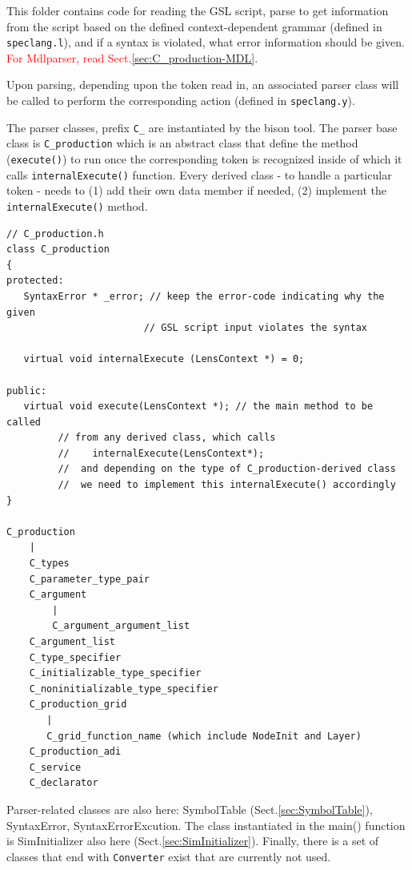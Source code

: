 
This folder contains code for reading the GSL script, parse to get information
from the script based on the defined context-dependent grammar (defined in
\verb!speclang.l!), and if a syntax is violated, what error information should
be given. \textcolor{red}{For Mdlparser, read Sect.\ref{sec:C_production-MDL}}.

Upon parsing, depending upon the token read in, an associated parser class will
be called to perform the corresponding action (defined in \verb!speclang.y!).

The parser classes, prefix \verb!C_! are instantiated by the bison tool.
The parser base class is \verb!C_production! which is an abstract class that
define the method (\verb!execute()!) to run once the corresponding token is recognized
inside of which it calls \verb!internalExecute()! function.
Every derived class - to handle a particular token - needs to (1) add their own data
member if needed, (2) implement the \verb!internalExecute()! method.

\begin{verbatim}
// C_production.h
class C_production
{
protected:
   SyntaxError * _error; // keep the error-code indicating why the given 
                        // GSL script input violates the syntax
   
   virtual void internalExecute (LensContext *) = 0;

public:
   virtual void execute(LensContext *); // the main method to be called
         // from any derived class, which calls
         //    internalExecute(LensContext*);
         //  and depending on the type of C_production-derived class
         //  we need to implement this internalExecute() accordingly
}

C_production
    |
    C_types
    C_parameter_type_pair
    C_argument
        |
        C_argument_argument_list
    C_argument_list
    C_type_specifier
    C_initializable_type_specifier
    C_noninitializable_type_specifier
    C_production_grid
       |
       C_grid_function_name (which include NodeInit and Layer)
    C_production_adi       
    C_service
    C_declarator
\end{verbatim}

Parser-related classes are also here: SymbolTable (Sect.\ref{sec:SymbolTable}),
SyntaxError, SyntaxErrorExcution. The class instantiated in the main() function is
SimInitializer also here (Sect.\ref{sec:SimInitializer}).
Finally, there is a set of classes that end with \verb!Converter! exist that are
currently not used.


